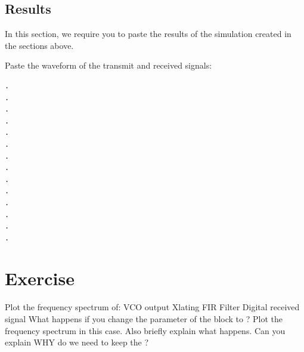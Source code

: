 \documentclass[11pt]{article}
\begin{document}
\subsection{Results}

In this section, we require you to paste the results of the simulation created in the sections above.


\begin{tcolorbox}[colback=blue!5]
  Paste the waveform of the transmit and received signals:
  \begin{mdframed}
    \begin{verbatim}
.
.    
.
.
.
.
.
.
.
.
.
.
.
.
  \end{verbatim}
  \end{mdframed}
\end{tcolorbox}

\section{Exercise}

\begin{outline}[enumerate]
  \1 Plot the frequency spectrum of:
  \2 VCO output
  \2 Xlating FIR Filter
  \2 Digital received signal
  \1 What happens if you change the  parameter of the  block to ?
  \2 Plot the frequency spectrum in this case. Also briefly explain what happens.
  \2 Can you explain WHY do we need to keep the \newline {}?
\end{outline}
\end{document}
